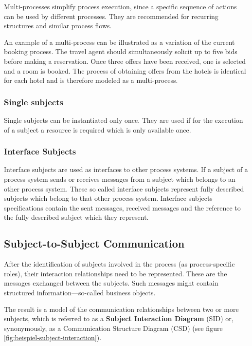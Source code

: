 Multi-processes simplify process execution, since a specific sequence of actions can be used by different processes. They are recommended for recurring structures and similar process flows. 

An example of a multi-process can be illustrated as a variation of the current booking process. The travel agent should simultaneously solicit up to five bids before making a reservation. Once three offers have been received, one is selected and a room is booked. The process of obtaining offers from the hotels is identical for each hotel and is therefore modeled as a multi-process.

\subsubsection{Single subjects}

Single subjects can be instantiated only once. They are used if for the execution of a subject a resource is required which is only available once.

\subsubsection{Interface Subjects}

Interface subjects are used as interfaces to other process systems. If a subject of a process system sends or receives messages from a subject which belongs to an other process system. These so called interface subjects represent fully described subjects which belong to that other process system. Interface subjects specifications contain the sent messages, received messages and the reference to the fully described subject which they represent.

\subsection{Subject-to-Subject Communication}

After the identification of subjects involved in the process (as process-specific roles), their interaction relationships need to be represented. These are the messages exchanged between the subjects. Such messages might contain structured information—so-called business objects.

The result is a model of the communication relationships between two or more subjects, which is referred to as a \textbf{Subject Interaction Diagram} (SID) or, synonymously, as a Communication Structure Diagram (CSD) (see figure \ref{fig:beispiel-subject-interaction}).


